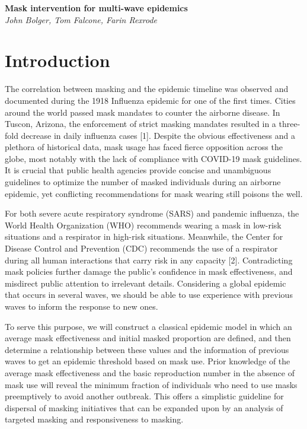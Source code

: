 \documentclass[11pt]{article}
\begin{document}
\begin{center}
\Large\textbf{Mask intervention for multi-wave epidemics}\\
\large\textit{John Bolger, Tom Falcone, Farin Rexrode}
\end{center}

\section*{Introduction}
The correlation between masking and the epidemic timeline was observed and documented during the 1918 Influenza epidemic for one of the first times. Cities around the world passed mask mandates to counter the airborne disease. In Tuscon, Arizona, the enforcement of strict masking mandates resulted in a three-fold decrease in daily influenza cases [1].
Despite the obvious effectiveness and a plethora of historical data, mask usage has faced fierce opposition across the globe, most notably with the lack of compliance with COVID-19 mask guidelines. It is crucial that public health agencies provide concise and unambiguous guidelines to optimize the number of masked individuals during an airborne epidemic, yet conflicting recommendations for mask wearing still poisons the well.

For both severe acute respiratory syndrome (SARS) and pandemic influenza, the World Health Organization (WHO) recommends wearing a mask in low-risk situations and a respirator in high-risk situations. Meanwhile, the Center for Disease Control and Prevention (CDC) recommends the use of a respirator during all human interactions that carry risk in any capacity [2]. Contradicting mask policies further damage the public's confidence in mask effectiveness, and misdirect public attention to irrelevant details. Considering a global epidemic that occurs in several waves, we should be able to use experience with previous waves to inform the response to new ones.

To serve this purpose, we will construct a classical epidemic model in which an average mask effectiveness and initial masked proportion are defined, and then determine a relationship between these values and the information of previous waves to get an epidemic threshold based on mask use. Prior knowledge of the average mask effectiveness and the basic reproduction number in the absence of mask use will reveal the minimum fraction of individuals who need to use masks preemptively to avoid another outbreak. This offers a simplistic guideline for dispersal of masking initiatives that can be expanded upon by an analysis of targeted masking and responsiveness to masking.
\end{document}
